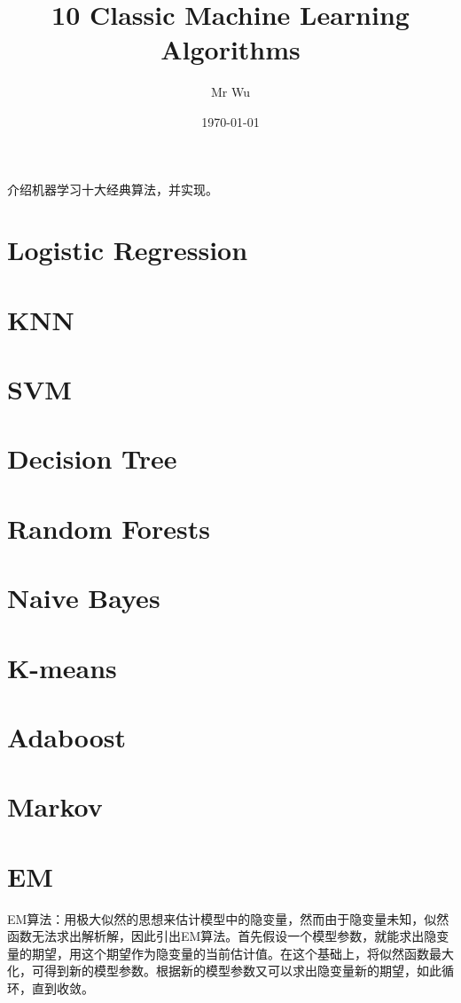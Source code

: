 \documentclass{ctexart}
\title{10 Classic Machine Learning Algorithms }
\author{Mr Wu}
\date{\today}
\begin{document}
	\maketitle
	介绍机器学习十大经典算法，并实现。
	\section{Logistic Regression}
	\section{KNN}
	\section{SVM}
	\section{Decision Tree}
	\section{Random Forests}
	\section{Naive Bayes}
	\section{K-means}
	\section{Adaboost}
	\section{Markov}
	\section{EM}
	EM算法：用极大似然的思想来估计模型中的隐变量，然而由于隐变量未知，似然函数无法求出解析解，因此引出EM算法。首先假设一个模型参数，就能求出隐变量的期望，用这个期望作为隐变量的当前估计值。在这个基础上，将似然函数最大化，可得到新的模型参数。根据新的模型参数又可以求出隐变量新的期望，如此循环，直到收敛。
\end{document}
